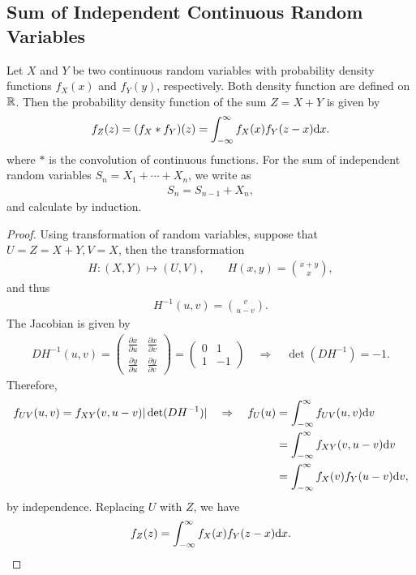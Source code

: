 \subsection*{Sum of Independent Continuous Random Variables}


\begin{theorem}
	\label{thrm:4}
	Let $X$ and $Y$ be two continuous random variables with probability density functions $f_X(x)$ and $f_Y(y)$, respectively. Both density function are defined on $\mathbb{R}$. Then the probability density function of the sum $Z = X + Y$ is given by
	\begin{align*}
	f_Z(z) = (f_X * f_Y)(z) = \int_{-\infty}^{\infty} f_X(x) f_Y(z-x) \mathrm{d}x.
	\end{align*}
	where $*$ is the convolution of continuous functions. For the sum of independent random variables $S_n = X_1 + \cdots + X_n$, we write as
	\begin{align*}
	S_n = S_{n-1} + X_n,
	\end{align*}
	and calculate by induction.
\end{theorem}
\begin{proof}
	Using transformation of random variables, suppose that $U = Z = X + Y, V = X$, then the transformation 
	\begin{align*}
	H: (X, Y)\mapsto (U, V), \qquad H(x, y) = \binom{x+y}{x},
	\end{align*}
	and thus
	\begin{align*}
	H^{-1}(u, v) = \binom{v}{u-v}.
	\end{align*}
	The Jacobian is given by
	\begin{align*}
	DH^{-1}(u, v) = \begin{pmatrix}
	\frac{\partial x}{\partial u} & \frac{\partial x}{\partial v} \\
	\frac{\partial y}{\partial u} & \frac{\partial y}{\partial v}
	\end{pmatrix} = \begin{pmatrix}
	0 & 1 \\
	1 & -1
	\end{pmatrix} \quad \Rightarrow\quad \det(DH^{-1}) = -1.
	\end{align*}
	Therefore,
	\begin{align*}
	f_{UV}(u, v) = f_{XY}(v, u-v) |\det(DH^{-1})| \quad\Rightarrow\quad f_{U}(u) & = \int_{-\infty}^{\infty} f_{UV}(u, v)\mathrm{d}v \\
	& = \int_{-\infty}^{\infty} f_{XY}(v, u-v) \mathrm{d}v \\
	& = \int_{-\infty}^{\infty} f_X(v) f_Y(u-v) \mathrm{d}v,
	\end{align*}
	by independence. Replacing $U$ with $Z$, we have
	\begin{align*}
	f_Z(z) = \int_{-\infty}^{\infty} f_X(x)f_Y(z-x)\mathrm{d}x.
	\end{align*}
\end{proof}

